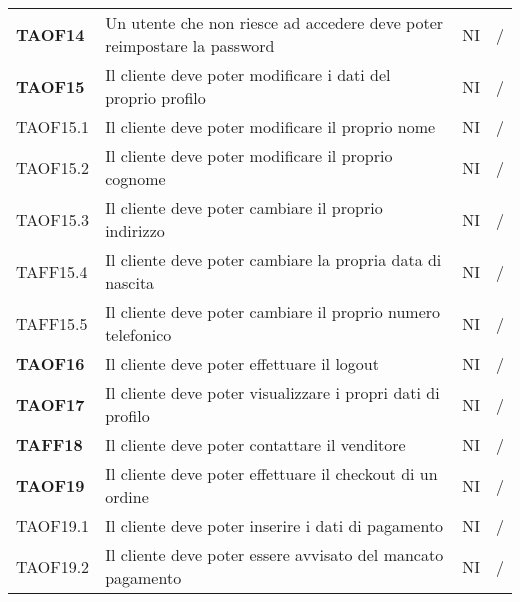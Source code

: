 \begin{center}
\begin{longtable}[!h]{p{60px} p{240px} p{35px} p{35px}}
        \textbf{TAOF14} & Un utente che non riesce ad accedere deve poter reimpostare la password                             & NI             & /              \\
        \textbf{TAOF15} & Il cliente deve poter modificare i dati del proprio profilo                                         & NI             & /              \\
        TAOF15.1        & Il cliente deve poter modificare il proprio nome                                                    & NI             & /              \\
        TAOF15.2        & Il cliente deve poter modificare il proprio cognome                                                 & NI             & /              \\
        TAOF15.3        & Il cliente deve poter cambiare il proprio indirizzo                                                 & NI             & /              \\
        TAFF15.4        & Il cliente deve poter cambiare la propria data di nascita                                           & NI             & /              \\
        TAFF15.5        & Il cliente deve poter cambiare il proprio numero telefonico                                         & NI             & /              \\
        \textbf{TAOF16} & Il cliente deve poter effettuare il logout                                                          & NI             & /              \\
        \textbf{TAOF17} & Il cliente deve poter visualizzare i propri dati di profilo                                         & NI             & /              \\
        \textbf{TAFF18} & Il cliente deve poter contattare il venditore                                                       & NI             & /              \\
        \textbf{TAOF19} & Il cliente deve poter effettuare il checkout di un ordine                                           & NI             & /              \\
        TAOF19.1        & Il cliente deve poter inserire i dati di pagamento                                                  & NI             & /              \\
        TAOF19.2        & Il cliente deve poter essere avvisato del mancato pagamento                                         & NI             & /              \\

\end{longtable}
\end{center}
